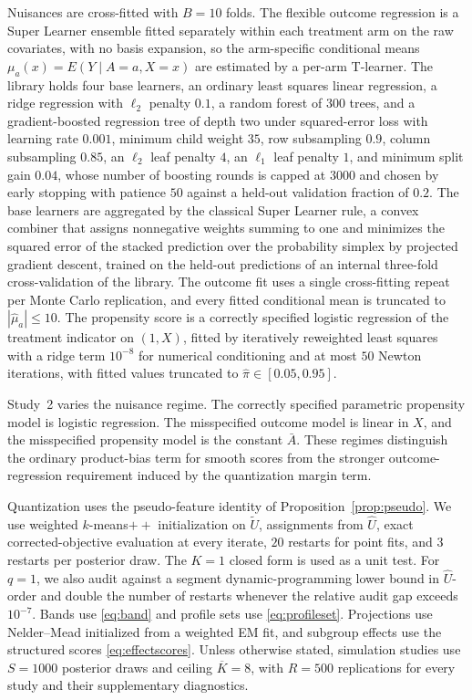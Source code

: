 \documentclass[11pt]{article}
\newcommand{\hU}{\widehat U}
\newcommand{\tU}{\widetilde U}
\begin{document}
Nuisances are cross-fitted with $B=10$ folds.  The flexible outcome regression is a Super Learner ensemble \citep{vanderlaan2007super} fitted separately within each treatment arm on the raw covariates, with no basis expansion, so the arm-specific conditional means $\mu_a(x)=E(Y\mid A=a,X=x)$ are estimated by a per-arm T-learner.  The library holds four base learners, an ordinary least squares linear regression, a ridge regression with $\ell_2$ penalty $0.1$, a random forest of $300$ trees, and a gradient-boosted regression tree of depth two under squared-error loss with learning rate $0.001$, minimum child weight $35$, row subsampling $0.9$, column subsampling $0.85$, an $\ell_2$ leaf penalty $4$, an $\ell_1$ leaf penalty $1$, and minimum split gain $0.04$, whose number of boosting rounds is capped at $3000$ and chosen by early stopping with patience $50$ against a held-out validation fraction of $0.2$.  The base learners are aggregated by the classical Super Learner rule, a convex combiner that assigns nonnegative weights summing to one and minimizes the squared error of the stacked prediction over the probability simplex by projected gradient descent, trained on the held-out predictions of an internal three-fold cross-validation of the library.  The outcome fit uses a single cross-fitting repeat per Monte Carlo replication, and every fitted conditional mean is truncated to $|\hat\mu_a|\le10$.  The propensity score is a correctly specified logistic regression of the treatment indicator on $(1,X)$, fitted by iteratively reweighted least squares with a ridge term $10^{-8}$ for numerical conditioning and at most $50$ Newton iterations, with fitted values truncated to $\hat\pi\in[0.05,0.95]$.

Study~2 varies the nuisance regime.  The correctly specified parametric propensity model is logistic regression.  The misspecified outcome model is linear in $X$, and the misspecified propensity model is the constant $\bar A$.  These regimes distinguish the ordinary product-bias term for smooth scores from the stronger outcome-regression requirement induced by the quantization margin term.

Quantization uses the pseudo-feature identity of Proposition~\ref{prop:pseudo}.  We use weighted $k$-means$++$ initialization on $\tU$, assignments from $\hU$, exact corrected-objective evaluation at every iterate, $20$ restarts for point fits, and $3$ restarts per posterior draw.  The $K=1$ closed form is used as a unit test.  For $q=1$, we also audit against a segment dynamic-programming lower bound in $\hU$-order and double the number of restarts whenever the relative audit gap exceeds $10^{-7}$.  Bands use \eqref{eq:band} and profile sets use \eqref{eq:profileset}.  Projections use Nelder--Mead initialized from a weighted EM fit, and subgroup effects use the structured scores \eqref{eq:effectscores}.  Unless otherwise stated, simulation studies use $S=1000$ posterior draws and ceiling $\overline K=8$, with $R=500$ replications for every study and their supplementary diagnostics.
\end{document}
